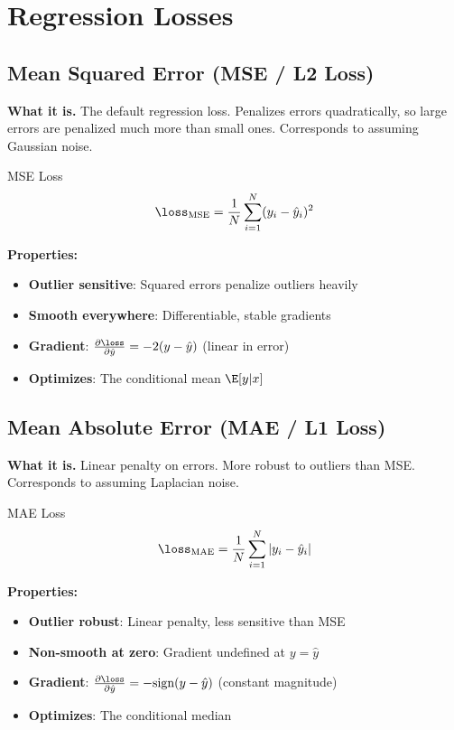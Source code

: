 \section{Regression Losses}
\label{sec:regression_losses}

\subsection{Mean Squared Error (MSE / L2 Loss)}

\textbf{What it is.} The default regression loss. Penalizes errors quadratically, so large errors are penalized much more than small ones. Corresponds to assuming Gaussian noise.

\begin{mathresult}{MSE Loss}
\begin{equation}
\loss_{\text{MSE}} = \frac{1}{N}\sum_{i=1}^{N}(y_i - \hat{y}_i)^2
\end{equation}
\end{mathresult}

\textbf{Properties:}
\begin{itemize}
    \item \textbf{Outlier sensitive}: Squared errors penalize outliers heavily
    \item \textbf{Smooth everywhere}: Differentiable, stable gradients
    \item \textbf{Gradient}: $\frac{\partial \loss}{\partial \hat{y}} = -2(y - \hat{y})$ (linear in error)
    \item \textbf{Optimizes}: The conditional mean $\E[y | x]$
\end{itemize}

\subsection{Mean Absolute Error (MAE / L1 Loss)}

\textbf{What it is.} Linear penalty on errors. More robust to outliers than MSE. Corresponds to assuming Laplacian noise.

\begin{mathresult}{MAE Loss}
\begin{equation}
\loss_{\text{MAE}} = \frac{1}{N}\sum_{i=1}^{N}|y_i - \hat{y}_i|
\end{equation}
\end{mathresult}

\textbf{Properties:}
\begin{itemize}
    \item \textbf{Outlier robust}: Linear penalty, less sensitive than MSE
    \item \textbf{Non-smooth at zero}: Gradient undefined at $y = \hat{y}$
    \item \textbf{Gradient}: $\frac{\partial \loss}{\partial \hat{y}} = -\text{sign}(y - \hat{y})$ (constant magnitude)
    \item \textbf{Optimizes}: The conditional median
\end{itemize}

